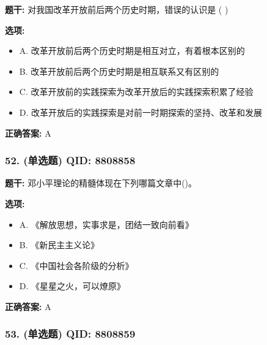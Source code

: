 \documentclass[12pt,UTF8]{ctexart}
\begin{document}
\textbf{题干:}
对我国改革开放前后两个历史时期，错误的认识是  ( )

\textbf{选项:}
\begin{itemize}[leftmargin=*]

  \item A. 改革开放前后两个历史时期是相互对立，有着根本区别的

  \item B. 改革开放前后两个历史时期是相互联系又有区别的

  \item C. 改革开放前的实践探索为改革开放后的实践探索积累了经验

  \item D. 改革开放后的实践探索是对前一时期探索的坚持、改革和发展

\end{itemize}

\textbf{正确答案:}
A

\vspace{0.3em}\hrulefill\vspace{0.7em}

\subsubsection*{52. (单选题) \small QID: 8808858}

\textbf{题干:}
邓小平理论的精髓体现在下列哪篇文章中()。

\textbf{选项:}
\begin{itemize}[leftmargin=*]

  \item A. 《解放思想，实事求是，团结一致向前看》

  \item B. 《新民主主义论》

  \item C. 《中国社会各阶级的分析》

  \item D. 《星星之火，可以燎原》

\end{itemize}

\textbf{正确答案:}
A

\vspace{0.3em}\hrulefill\vspace{0.7em}

\subsubsection*{53. (单选题) \small QID: 8808859}
\end{document}

